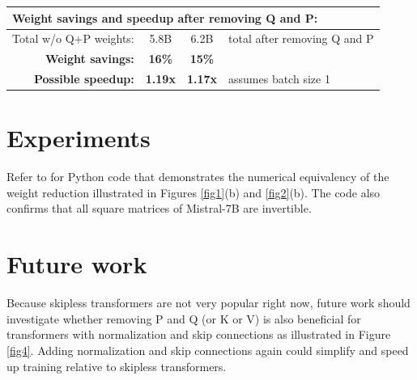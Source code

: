 \documentclass{article}
\begin{document}
\begin{center}
\begin{tabular}{|l|c|c|l|}
  \multicolumn{4}{|l|}{\textbf{Weight savings and speedup after removing Q and P:}}                         \\ \hline
  Total w/o Q+P weights:                           & 5.8B           & 6.2B   & total after removing Q and P \\ \hline
  \multicolumn{1}{|r|}{\textbf{Weight savings:}}   & \textbf{16\%}  & \textbf{15\%}  &                      \\ \hline
  \multicolumn{1}{|r|}{\textbf{Possible speedup:}} & \textbf{1.19x} & \textbf{1.17x} & assumes batch size 1 \\ \hline
\end{tabular} \end{center}
\endgroup

\section{Experiments}
Refer to \cite{tricks} for Python code that demonstrates the numerical equivalency of the weight reduction illustrated in Figures \ref{fig1}(b) and \ref{fig2}(b). The code also confirms that all square matrices of Mistral-7B are invertible.

\section{Future work}
Because skipless transformers are not very popular right now, future work should investigate whether removing P and Q (or K or V) is also beneficial for transformers with normalization and skip connections as illustrated in Figure \ref{fig4}. Adding normalization and skip connections again could simplify and speed up training relative to skipless transformers.
\end{document}
